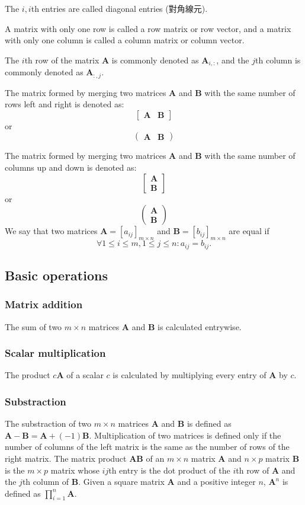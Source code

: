 \documentclass[a4paper,12pt]{report}
\begin{document}
The $i,i$th entries are called diagonal entries (對角線元).

A matrix with only one row is called a row matrix or row vector, and a matrix with only one column is called a column matrix or column vector.

The $i$th row of the matrix $\mathbf{A}$ is commonly denoted as $\mathbf{A}_{i,:}$, and the $j$th column is commonly denoted as $\mathbf{A}_{:,j}$.

The matrix formed by merging two matrices $\mathbf{A}$ and $\mathbf{B}$ with the same number of rows left and right is denoted as:
\[\begin{bmatrix}\mathbf{A} & \mathbf{B}\end{bmatrix}\]
or
\[\begin{pmatrix}\mathbf{A} & \mathbf{B}\end{pmatrix}\]

The matrix formed by merging two matrices $\mathbf{A}$ and $\mathbf{B}$ with the same number of columns up and down is denoted as:
\[\begin{bmatrix}\mathbf{A} \\ \mathbf{B}\end{bmatrix}\]
or
\[\begin{pmatrix}\mathbf{A} \\ \mathbf{B}\end{pmatrix}\]
We say that two matrices $\mathbf{A}=[a_{ij}]_{m\times n}$ and $\mathbf{B}=[b_{ij}]_{m\times n}$ are equal if 
\[\forall 1\leq i\leq m,1\leq j\leq n\colon a_{ij}=b_{ij}.\]
\subsection{Basic operations}
\subsubsection{Matrix addition}
The sum of two $m\times n$ matrices $\mathbf{A}$ and $\mathbf{B}$ is calculated entrywise.
\subsubsection{Scalar multiplication}
The product $c\mathbf{A}$ of a scalar $c$ is calculated by multiplying every entry of $\mathbf{A}$ by $c$.
\subsubsection{Substraction}
The substraction of two $m\times n$ matrices $\mathbf{A}$ and $\mathbf{B}$ is defined as $\mathbf{A}-\mathbf{B}=\mathbf{A}+(-1)\mathbf{B}$.
Multiplication of two matrices is defined only if the number of columns of the left matrix is the same as the number of rows of the right matrix. The matrix product $\mathbf{A}\mathbf{B}$ of an $m\times n$ matrix $\mathbf{A}$ and $n\times p$ matrix $\mathbf{B}$ is the $m\times p$ matrix whose $ij$th entry is the dot product of the $i$th row of $\mathbf{A}$ and the $j$th column of $\mathbf{B}$.
Given a square matrix $\mathbf{A}$ and a positive integer $n$, $\mathbf{A}^n$ is defined as $\prod_{i=1}^n\mathbf{A}$.
\end{document}
